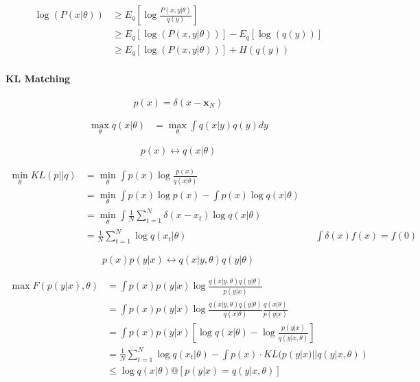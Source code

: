 	\begin{align*}
		\log(P(x|\theta))&\geq E_q\left[\log\frac{P(x,y|\theta)}{q(y)}\right]\\
		&\geq E_q\left[\log(P(x,y|\theta))\right] - E_q[\log(q(y))]\\
		&\geq E_q\left[\log(P(x,y|\theta))\right] + H(q(y))
	\end{align*}

	\paragraph{KL Matching}
	
	\begin{equation}
		p(x)=\delta(x-\mathbf{x}_N)
	\end{equation}
	
	\begin{align*}
		\max_\theta q(x|\theta) &=\max_\theta  \int q(x|y)q(y)dy
	\end{align*}
	
	\begin{equation}
		p(x)\leftrightarrow q(x|\theta)
	\end{equation}
	
	\begin{align*}
		\min_{\theta}KL(p||q)&=\min_{\theta}\int p(x)\log \frac{p(x)}{q(x|\theta)}
		\\&=\min_{\theta}\int p(x)\log p(x) - \int p(x)\log q(x|\theta)
		\\&=\min_{\theta}\int \frac{1}{N}\sum_{t=1}^N \delta(x-x_t)\log q(x|\theta)
		\\&=\frac{1}{N}\sum_{t=1}^N\log q(x_t|\theta) && \int \delta(x)f(x) = f(0)
	\end{align*}

	\begin{equation}
		p(x)p(y|x)\leftrightarrow q(x|y,\theta)q(y|\theta)
	\end{equation}
	
	\begin{align*}
		\max F(p(y|x),\theta)&=\int p(x)p(y|x)\log\frac{q(x|y,\theta)q(y|\theta)}{p(y|x)}\\
		&=\int p(x)p(y|x)\log\frac{q(x|y,\theta)q(y|\theta)}{q(x|\theta)}\frac{q(x|\theta)}{p(y|x)}\\
		&=\int p(x)p(y|x)\left[\log q(x|\theta)-\log\frac{p(y|x)}{q(y|x,\theta)} \right]\\
		&=\frac{1}{N}\sum_{t=1}^N\log q(x_t|\theta) - \int p(x)\cdot KL(p(y|x)||q(y|x,\theta))\\
		&\leq\log q(x|\theta) @ [p(y|x)=q(y|x,\theta)]
	\end{align*}


